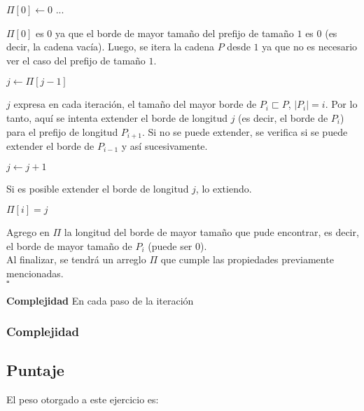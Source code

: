 \begin{algorithmic}
  \State $\Pi[0] \gets 0$
     \State ...
  \EndFor
\end{algorithmic}
$\Pi[0]$ es $0$ ya que el borde de mayor tamaño del prefijo de tamaño $1$ es $0$ (es decir, la cadena vacía). Luego, se itera la cadena $P$ desde $1$ ya que no es necesario ver el caso del prefijo de tamaño $1$.\\

\begin{algorithmic}
	\State $j \gets \Pi[j-1]$
\EndWhile
\end{algorithmic}

$j$ expresa en cada iteración, el tamaño del mayor borde de $P_i \sqsubset P$, $|P_i| = i$.
Por lo tanto, aquí se intenta extender el borde de longitud $j$ (es decir, el borde de $P_i$) para el prefijo de longitud $P_{i+1}$. Si no se puede extender, se verifica si se puede extender el borde de $P_{i-1}$ y así sucesivamente.\\

\begin{algorithmic}
	\State $j \gets j+1$
\EndIf
\end{algorithmic}

Si es posible extender el borde de longitud $j$, lo extiendo.\\

\begin{algorithmic}
\State $\Pi[i] = j$
\end{algorithmic}

Agrego en $\Pi$ la longitud del borde de mayor tamaño que pude encontrar, es decir, el borde de mayor tamaño de $P_i$ (puede ser $0$).\\

Al finalizar, se tendrá un arreglo $\Pi$ que cumple las propiedades previamente mencionadas.\\

\hfill\ensuremath{\square}

\textbf{Complejidad}
En cada paso de la iteración
\subsubsection{Complejidad}

\subsection{Puntaje}
El peso otorgado a este ejercicio es:
